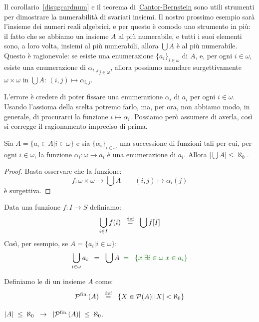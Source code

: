 Il corollario~\ref{disugcardnum} e il teorema
di~\hyperref[CB]{Cantor-Bernstein} sono utili strumenti per dimostrare la
numerabilit\`a di svariati insiemi. Il nostro prossimo esempio sar\`a
l'insieme dei numeri reali algebrici, e per questo \`e comodo uno
strumento in pi\`u: il fatto che se abbiamo un insieme $A$ al pi\`u numerabile, e tutti i suoi elementi sono, a loro volta, insiemi al pi\`u numerabili, allora
$\bigcup A$ \`e al pi\`u numerabile.
Questo \`e ragionevole: se esiste una enumerazione $\{a_i\}_{i \in
\omega}$ di $A$, e, per ogni $i \in \omega$, esiste una enumerazione di
${\alpha_{i,j}}_{j\in\omega}$,
allora possiamo mandare surgettivamente $\omega \times \omega$ in $\bigcup
A$: $(i,j)\mapsto\alpha_{i,j}$.

{\drkred L'errore} \`e credere di poter fissare una enumerazione
$\alpha_i$ di $a_i$ per ogni $i \in \omega$. Usando l'assioma della scelta
potremo farlo, ma, per ora, non abbiamo modo, in generale, di procurarci
la funzione $i\mapsto\alpha_i$.
Possiamo per\`o assumere di averla, cos\`i si corregge il ragionamento impreciso di prima.

\begin{proposition}
	Sia $A = \{a_i \in A| i \in \omega\}$ e sia $\{\alpha_i\}_{i \in \omega}$ una successione di funzioni tali per cui,
	per ogni $i \in \omega$, la funzione $\alpha_i\colon \omega \to a_i$ \`e una enumerazione di $a_i$. Allora $\left|\bigcup A\right| \leq \aleph_0$.
\end{proposition}

\begin{proof}
	Basta osservare che la funzione:
\[f \colon \omega \times \omega \to \bigcup A \qquad (i,j) \mapsto
\alpha_i(j) \]
	\`e surgettiva.
\end{proof}

\begin{notation}
	Data una funzione $f \colon I \rightarrow S$ definiamo:
	\[ \bigcup_{i \in I} f(i) \;\;\overset{\text{def}}{=}\;\; \bigcup f[I]
		\]
	Cos\`i, per esempio, se $A = \{a_i | i \in \omega\}$:
	\[ \bigcup_{i \in \omega} a_i \;\;=\;\; \bigcup A \;\;{\drkgrn =\;\; \{x | \exists i \in \omega \; x \in a_i\}}
		\]
\end{notation}

\begin{definition}
	Definiamo le  di un insieme $A$ come:
	\[ \mathcal{P}^{\text{fin.}}(A) \;\;\overset{\text{def}}{=}\;\; \{X \in \mathcal{P}(A) | |X| < \aleph_0\}
		\]
\end{definition}

\begin{proposition}
	$|A| \;\leq\; \aleph_0 \;\;\rightarrow\;\; |\mathcal{P}^{\text{fin.}}(A)| \;\leq\; \aleph_0$.
\end{proposition}

